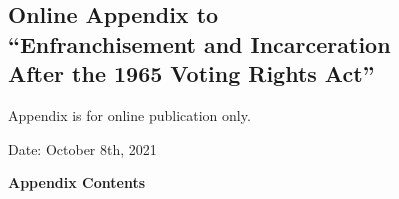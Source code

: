 \documentclass[12pt]{article}
\begin{document}
\singlespacing
\clearpage
\newpage








\normalsize

\appendix




\clearpage

\begin{center}
\singlespacing
	\section*{\normalfont \LARGE Online Appendix to \\``Enfranchisement and Incarceration \\ After the 1965 Voting Rights Act''}

	\normalsize
	\vspace{.2in}
	{Appendix is for online publication only.}


	\large
	\vspace{.25in}
	Date: October 8th, 2021

\end{center}


\vspace{.2in}
\singlespacing
\normalsize

\setcounter{footnote}{0}
\setcounter{equation}{0}
\setcounter{page}{1}

\renewcommand{\thesubsection}{\Alph{subsection}}

\singlespacing
\noindent \textbf{Appendix Contents} \\
\end{document}
